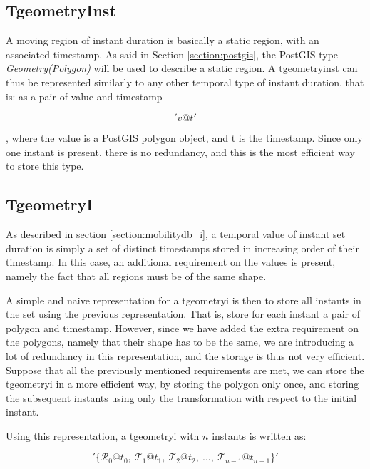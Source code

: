 \subsection{TgeometryInst}
\label{section:internal_repr_inst}

A moving region of instant duration is basically a static region, with an associated timestamp. As said in Section \ref{section:postgis}, the PostGIS type \textit{Geometry(Polygon)} will be used to describe a static region. A tgeometryinst can thus be represented similarly to any other temporal type of instant duration, that is: as a pair of value and timestamp

\[
    'v@t'
\]

, where the value is a PostGIS polygon object, and t is the timestamp. Since only one instant is present, there is no redundancy, and this is the most efficient way to store this type.

\subsection{TgeometryI}
\label{section:internal_repr_i}

As described in section \ref{section:mobilitydb_i}, a temporal value of instant set duration is simply a set of distinct timestamps stored in increasing order of their timestamp. In this case, an additional requirement on the values is present, namely the fact that all regions must be of the same shape.

A simple and naive representation for a tgeometryi is then to store all instants in the set using the previous representation. That is, store for each instant a pair of polygon and timestamp. However, since we have added the extra requirement on the polygons, namely that their shape has to be the same, we are introducing a lot of redundancy in this representation, and the storage is thus not very efficient. \\

Suppose that all the previously mentioned requirements are met, we can store the tgeometryi in a more efficient way, by storing the polygon only once, and storing the subsequent instants using only the transformation with respect to the initial instant. 

Using this representation, a tgeometryi with $n$ instants is written as:

\[
    '\{\mathcal{R}_0@t_0,\ \mathcal{T}_1@t_1,\ \mathcal{T}_2@t_2,\ ..., \ \mathcal{T}_{n-1}@t_{n-1}\}'
\]

